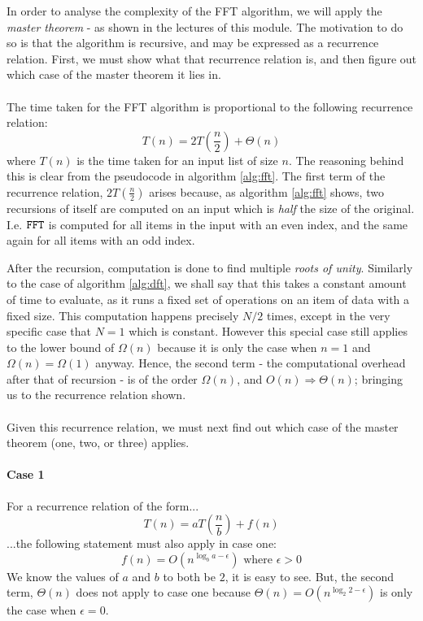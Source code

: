 \documentclass[]{article}
\begin{document}
In order to analyse the complexity of the FFT algorithm, we will apply the \emph{master theorem} - as shown in the lectures of this module. The motivation to do so is that the algorithm is recursive, and may be expressed as a recurrence relation. First, we must show what that recurrence relation is, and then figure out which case of the master theorem it lies in.
\\\\
The time taken for the FFT algorithm is proportional to the following recurrence relation:
$$T(n) = 2T(\frac{n}{2}) + \Theta(n)$$
where $T(n)$ is the time taken for an input list of size $n$. The reasoning behind this is clear from the pseudocode in algorithm \ref{alg:fft}. The first term of the recurrence relation, $2T(\frac{n}{2})$ arises because, as algorithm \ref{alg:fft} shows, two recursions of itself are computed on an input which is \emph{half} the size of the original. I.e. $\verb|FFT|$ is computed for all items in the input with an even index, and the same again for all items with an odd index.

After the recursion, computation is done to find multiple \emph{roots of unity}. Similarly to the case of algorithm \ref{alg:dft}, we shall say that this takes a constant amount of time to evaluate, as it runs a fixed set of operations on an item of data with a fixed size. This computation happens precisely $N/2$ times, except in the very specific case that $N = 1$ which is constant. However this special case still applies to the lower bound of $\Omega(n)$ because it is only the case when $n = 1$ and $\Omega(n) = \Omega(1)$ anyway. Hence, the second term - the computational overhead after that of recursion - is of the order $\Omega(n)$, and $O(n) \Rightarrow \Theta(n)$; bringing us to the recurrence relation shown.
\\\\
Given this recurrence relation, we must next find out which case of the master theorem (one, two, or three) applies.
\paragraph{Case 1}
For a recurrence relation of the form...
$$T(n) = aT(\frac{n}{b}) + f(n)$$
...the following statement must also apply in case one:
\[
f(n) = O(n^{\log_b{a - \epsilon}}) \text{ where } \epsilon > 0
\]
We know the values of $a$ and $b$ to both be $2$, it is easy to see. But, the second term, $\Theta(n)$ does not apply to case one because $\Theta(n) = O(n^{\log_2{2 - \epsilon}})$ is only the case when $\epsilon = 0$.
\end{document}
